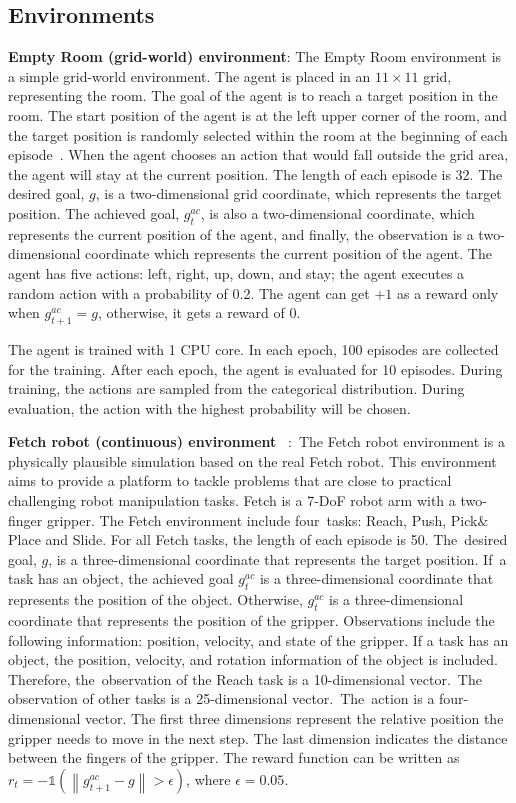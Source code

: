 \subsection{Environments}
\textbf{{Empty Room (grid-world) environment}}:
The Empty Room environment is a simple grid-world environment. The agent is placed in an $11\times11$ grid, representing the room. The goal of the agent is to reach a target position in the room. The start position of the agent is at the left upper corner of the room, and the target position is randomly selected within the room at the beginning of each episode~\cite{rauber2018hindsight}. When the agent chooses an action that would fall outside the grid area, the agent will stay at the current position. The length of each episode is 32. 
The desired goal, $g$, is a two-dimensional grid coordinate, which represents the target position. The achieved goal, $g^{ac}_{t}$, is also a two-dimensional coordinate, which represents the current position of the agent, and finally, the observation is a two-dimensional coordinate which represents the current position of the agent. 
The agent has five actions: left, right, up, down, and stay; the agent executes a random action with a probability of 0.2. The agent can get $+1$ as a reward only when $g^{ac}_{t+1}=g$, otherwise, it gets a reward of $0$. 

The agent is trained with 1 CPU core. In each epoch, 100 episodes are collected for the training. After each epoch, the agent is evaluated for 10 episodes. During training, the actions are sampled from the categorical distribution. During evaluation, the action with the highest probability will be chosen. 

\textbf{{Fetch robot (continuous) environment}%
}~\cite{plappert2018multi}:~The Fetch robot environment is a physically plausible simulation based on the real Fetch robot. This environment aims to provide a platform to tackle problems that are close to practical challenging robot manipulation tasks. Fetch is a 7-DoF robot arm with a two-finger gripper. The Fetch environment include four~tasks: Reach, Push, Pick$\&$Place and Slide. For all Fetch tasks, the length of each episode is 50. The~desired goal, $g$, is a three-dimensional coordinate that represents the target position. If~a task has an object, the achieved goal $g^{ac}_{t}$ is a three-dimensional coordinate that represents the position of the object. Otherwise, $g^{ac}_{t}$ is a three-dimensional coordinate that represents the position of the gripper.
Observations include the following information: position, velocity, and state of the gripper. If a task has an object, the position, velocity, and rotation information of the object is included. Therefore, the~observation of the Reach task is a 10-dimensional vector.~The observation of other tasks is a 25-dimensional vector.~The~action is a four-dimensional vector. The first three dimensions represent the relative position the gripper needs to move in the next step. The last dimension indicates the distance between the fingers of the gripper.
The reward function can be written as $r_{t}=-\mathds{1}\left(\left\|g^{ac}_{t+1} - g\right\|>\epsilon\right)$, where $\epsilon =0.05$.

